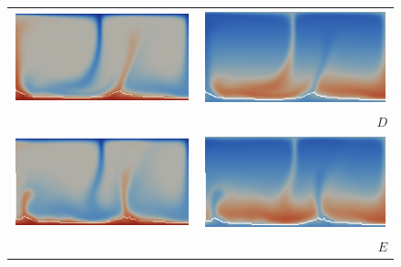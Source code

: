 \begin{figure}
\begin{tabular}{cr}
    \includegraphics[width=\twofigs]{chapters/vynnytska/png/tmD.png} &
    \includegraphics[width=\twofigs]{chapters/vynnytska/png/visD.png} \\& $D$ \\
    \includegraphics[width=\twofigs]{chapters/vynnytska/png/tmE.png} &
    \includegraphics[width=\twofigs]{chapters/vynnytska/png/visE.png} \\& $E$ \\

\end{tabular}
\end{figure}
